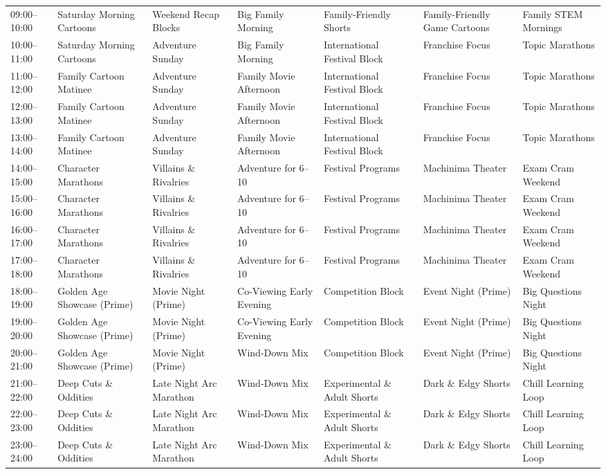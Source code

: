 \documentclass[12pt,letterpaper,twoside]{report}
\begin{document}
\begin{landscape}
\begin{longtable}{@{}L{2.4cm}L{2.65cm}L{2.65cm}L{2.65cm}L{2.65cm}L{2.65cm}L{2.65cm}@{}}
09:00--10:00 & Saturday Morning Cartoons & Weekend Recap Blocks & Big Family Morning & Family-Friendly Shorts & Family-Friendly Game Cartoons & Family STEM Mornings \\
10:00--11:00 & Saturday Morning Cartoons & Adventure Sunday & Big Family Morning & International Festival Block & Franchise Focus & Topic Marathons \\
11:00--12:00 & Family Cartoon Matinee & Adventure Sunday & Family Movie Afternoon & International Festival Block & Franchise Focus & Topic Marathons \\
12:00--13:00 & Family Cartoon Matinee & Adventure Sunday & Family Movie Afternoon & International Festival Block & Franchise Focus & Topic Marathons \\
13:00--14:00 & Family Cartoon Matinee & Adventure Sunday & Family Movie Afternoon & International Festival Block & Franchise Focus & Topic Marathons \\
14:00--15:00 & Character Marathons & Villains \& Rivalries & Adventure for 6--10 & Festival Programs & Machinima Theater & Exam Cram Weekend \\
15:00--16:00 & Character Marathons & Villains \& Rivalries & Adventure for 6--10 & Festival Programs & Machinima Theater & Exam Cram Weekend \\
16:00--17:00 & Character Marathons & Villains \& Rivalries & Adventure for 6--10 & Festival Programs & Machinima Theater & Exam Cram Weekend \\
17:00--18:00 & Character Marathons & Villains \& Rivalries & Adventure for 6--10 & Festival Programs & Machinima Theater & Exam Cram Weekend \\
18:00--19:00 & Golden Age Showcase (Prime) & Movie Night (Prime) & Co-Viewing Early Evening & Competition Block & Event Night (Prime) & Big Questions Night \\
19:00--20:00 & Golden Age Showcase (Prime) & Movie Night (Prime) & Co-Viewing Early Evening & Competition Block & Event Night (Prime) & Big Questions Night \\
20:00--21:00 & Golden Age Showcase (Prime) & Movie Night (Prime) & Wind-Down Mix & Competition Block & Event Night (Prime) & Big Questions Night \\
21:00--22:00 & Deep Cuts \& Oddities & Late Night Arc Marathon & Wind-Down Mix & Experimental \& Adult Shorts & Dark \& Edgy Shorts & Chill Learning Loop \\
22:00--23:00 & Deep Cuts \& Oddities & Late Night Arc Marathon & Wind-Down Mix & Experimental \& Adult Shorts & Dark \& Edgy Shorts & Chill Learning Loop \\
23:00--24:00 & Deep Cuts \& Oddities & Late Night Arc Marathon & Wind-Down Mix & Experimental \& Adult Shorts & Dark \& Edgy Shorts & Chill Learning Loop \\
\end{longtable}
\end{landscape}
\end{document}
